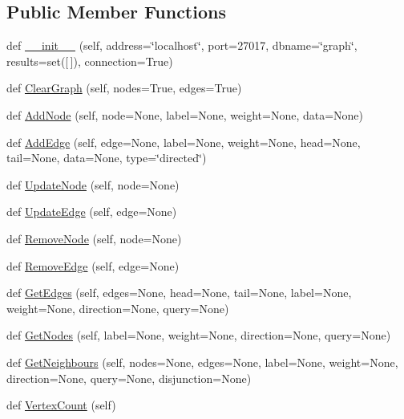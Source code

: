 \subsection*{Public Member Functions}
\begin{DoxyCompactItemize}
\item 
def \hyperlink{classgraphmongo_1_1GraphMongo_aab68747470d18460a87e296ff6e2a651}{\+\_\+\+\_\+init\+\_\+\+\_\+} (self, address=\char`\"{}localhost\char`\"{}, port=27017, dbname=\char`\"{}graph\char`\"{}, results=set(\mbox{[}$\,$\mbox{]}), connection=True)
\item 
def \hyperlink{classgraphmongo_1_1GraphMongo_a87d7b0d238de463bfffcae1a4ed7683f}{Clear\+Graph} (self, nodes=True, edges=True)
\item 
def \hyperlink{classgraphmongo_1_1GraphMongo_aa05e3a72c1e916e2d462c53e5f9a0bda}{Add\+Node} (self, node=None, label=None, weight=None, data=None)
\item 
def \hyperlink{classgraphmongo_1_1GraphMongo_add06fd535fdfe5dce31d0da7c06676fc}{Add\+Edge} (self, edge=None, label=None, weight=None, head=None, tail=None, data=None, type=\char`\"{}directed\char`\"{})
\item 
def \hyperlink{classgraphmongo_1_1GraphMongo_a09a2ea8847630acec5cdaab591ce82c0}{Update\+Node} (self, node=None)
\item 
def \hyperlink{classgraphmongo_1_1GraphMongo_a316443d72fac9aac57b3b3e74be96960}{Update\+Edge} (self, edge=None)
\item 
def \hyperlink{classgraphmongo_1_1GraphMongo_a3461c57941092ca2f34b253896594fc1}{Remove\+Node} (self, node=None)
\item 
def \hyperlink{classgraphmongo_1_1GraphMongo_a20e7f0726ec6951a51f9565702bd96e0}{Remove\+Edge} (self, edge=None)
\item 
def \hyperlink{classgraphmongo_1_1GraphMongo_a4ead15bb7429e6261ba3ff04d8e0ad34}{Get\+Edges} (self, edges=None, head=None, tail=None, label=None, weight=None, direction=None, query=None)
\item 
def \hyperlink{classgraphmongo_1_1GraphMongo_a08cfc20b885f77e0e22f9a9a7482dac6}{Get\+Nodes} (self, label=None, weight=None, direction=None, query=None)
\item 
def \hyperlink{classgraphmongo_1_1GraphMongo_ab820ea7237fd30bb51621800150e67d4}{Get\+Neighbours} (self, nodes=None, edges=None, label=None, weight=None, direction=None, query=None, disjunction=None)
\item 
def \hyperlink{classgraphmongo_1_1GraphMongo_af69f7a68ca1699c1586c71763c065d7c}{Vertex\+Count} (self)

\end{DoxyCompactItemize}
